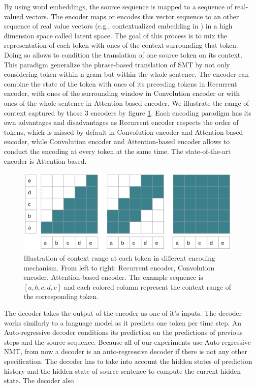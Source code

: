 By using word embeddings, the source sequence is mapped to a sequence of real-valued vectors. The encoder maps or encodes this vector sequence to an other sequence of real value vectors (e.g., contextualized embedding in \cite{Vaswani17attention,Bahdanau15learning, Cho14properties}) in a high dimension space called latent space. The goal of this process is to mix the representation of each token with ones of the context surrounding that token. Doing so allows to condition the translation of one source token on its context. This paradigm generalize the phrase-based translation of SMT by not only considering token within n-gram but within the whole sentence. The encoder can combine the state of the token with ones of its preceding tokens in Recurrent encoder, with ones of the surrounding window in Convolution encoder or with ones of the whole sentence in Attention-based encoder. We illustrate the range of context captured by those 3 encoders by figure \ref{fig:attention}. Each encoding paradigm has its own advantages and disadvantages as Recurrent encoder respects the order of tokens, which is missed by default in Convolution encoder and Attention-based encoder, while Convolution encoder and Attention-based encoder allows to conduct the encoding at every token at the same time. The state-of-the-art encoder is Attention-based.

\begin{figure}[htbp]
\includegraphics[width=\textwidth]{graphics/encoding.png}
\caption[Illustration of context range at each token in different encoding mechanism]{Illustration of context range at each token in different encoding mechanism. From left to right: Recurrent encoder, Convolution encoder, Attention-based encoder. The example sequence is $[a,b,c,d,e]$ and each colored column represent the context range of the corresponding token.}
\label{fig:attention}
\end{figure}

The decoder takes the output of the encoder as one of it's inputs. The decoder works similarly to a language model as it predicts one token per time step. An Auto-regressive decoder conditions its prediction on the predictions of previous steps and the source sequence. Because all of our experiments use Auto-regressive NMT, from now a decoder is an auto-regressive decoder if there is not any other specification. The decoder has to take into account the hidden states of prediction history and the hidden state of source sentence to compute the current hidden state. The decoder also

